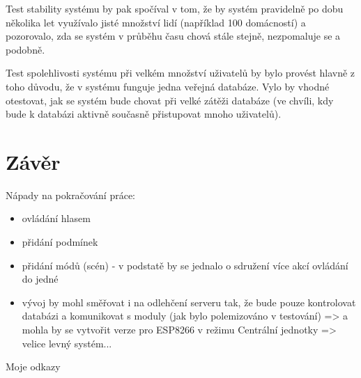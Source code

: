 Test stability systému by pak spočíval v tom, že by systém pravidelně po dobu několika let využívalo jisté množství lidí (například 100 domácností) a pozorovalo, zda se systém v průběhu času chová stále stejně, nezpomaluje se a podobně.

Test spolehlivosti systému při velkém množství uživatelů by bylo provést hlavně z toho důvodu, že v systému funguje jedna veřejná databáze. Vylo by vhodné otestovat, jak se systém bude chovat při velké zátěži databáze (ve chvíli, kdy bude k databázi aktivně současně přistupovat mnoho uživatelů).






























\chapter{Závěr}
\label{zaver}

Nápady na pokračování práce:
\begin{itemize}
    \item ovládání hlasem
    \item přidání podmínek
    \item přidání módů (scén) - v podstatě by se jednalo o sdružení více akcí ovládání do jedné
    \item vývoj by mohl směřovat i na odlehčení serveru tak, že bude pouze kontrolovat databázi a komunikovat s moduly (jak bylo polemizováno v testování) => a mohla by se vytvořit verze pro ESP8266 v režimu Centrální jednotky => velice levný systém...
\end{itemize}

Moje odkazy \cite{4technologie} \cite{BezdratoveSite} \cite{DesigningEmbeddedSystems} \cite{EmbeddedSystems}
\cite{EmbeddedSystemsCircuits}
\cite{ITURegulations} \cite{MicroprocessorAndInterfaces} \cite{WifiFrequencyBands} \cite{uCvsCPU} \cite{arduino} \cite{ArduinoProgramming} \cite{whatIsIR} \cite{optics} \cite{physics} \cite{HomeAutomationRPI} \cite{Everything2_4GHZ} \cite{microwave} \cite{materials} \cite{wirelessComunication} \cite{NetworkSecurity} \cite{RPiPrirucka} \cite{BluetoothGuide} \cite{WirelessPersonalCommunications} \cite{GettingStartedBluetooth} \cite{Why2_4GHz} \cite{ESP8266} \cite{ESP32} \cite{HandsOnZigBee} \cite{ZigbeeWirelessNetworking}


